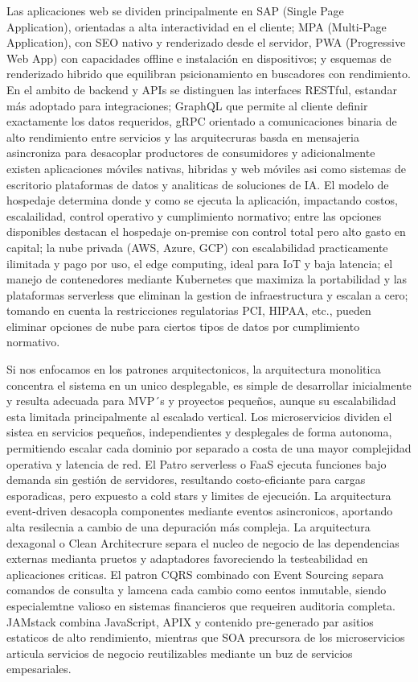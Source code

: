 \documentclass[
	article,			%
	11pt,				%
	oneside,			%
	a4paper,			%
	english,			%
	brazil,				%
	sumario=tradicional
	]{abntex2}
\begin{document}
Las aplicaciones web se dividen principalmente en SAP (Single Page Application), orientadas a alta interactividad en el cliente; MPA (Multi-Page Application), con SEO nativo y renderizado desde el servidor, PWA (Progressive Web App) con capacidades offline e instalación en dispositivos; y esquemas de renderizado hibrido que equilibran psicionamiento en buscadores con rendimiento.  En el ambito de backend y APIs se distinguen las interfaces RESTful, estandar más adoptado para integraciones; GraphQL que permite al cliente definir exactamente los datos requeridos, gRPC orientado a comunicaciones binaria de alto rendimiento entre servicios y las arquitecruras basda en mensajeria asincroniza para desacoplar productores de consumidores y adicionalmente existen aplicaciones móviles nativas, hibridas y web móviles asi como sistemas de escritorio plataformas de datos y analiticas de soluciones de IA.
El modelo de hospedaje determina donde y como se ejecuta la aplicación, impactando costos, escalailidad, control operativo y cumplimiento normativo; entre las opciones disponibles destacan el hospedaje on-premise con control total pero alto gasto en capital; la nube privada (AWS, Azure, GCP) con escalabilidad practicamente ilimitada y pago por uso, el edge computing, ideal para IoT y baja latencia; el manejo de contenedores mediante Kubernetes que maximiza la portabilidad y las plataformas serverless que eliminan la gestion de infraestructura y escalan a cero; tomando en cuenta la restricciones regulatorias PCI, HIPAA, etc., pueden eliminar opciones de nube para ciertos tipos de datos por cumplimiento normativo.

Si nos enfocamos en los patrones arquitectonicos, la arquitectura monolitica concentra el sistema en un unico desplegable, es simple de desarrollar inicialmente y resulta adecuada para MVP´s y proyectos pequeños, aunque su escalabilidad esta limitada principalmente al escalado vertical.  Los microservicios dividen el sistea en servicios pequeños, independientes y desplegales de forma autonoma, permitiendo escalar cada dominio por separado a costa de una mayor complejidad operativa y latencia de red.  El Patro serverless o FaaS ejecuta funciones bajo demanda sin gestión de servidores, resultando costo-eficiante para cargas esporadicas, pero expuesto a cold stars y limites de ejecución.  La arquitectura event-driven desacopla componentes mediante eventos asincronicos, aportando alta resilecnia a cambio de una depuración más compleja.  La arquitectura dexagonal o Clean Architecrure separa el nucleo de negocio de las dependencias externas medianta pruetos y adaptadores favoreciendo la testeabilidad en aplicaciones criticas. El patron CQRS combinado con Event Sourcing separa comandos de consulta y lamcena cada cambio como eentos inmutable, siendo especialemtne valioso en sistemas financieros que requeiren auditoria completa.  JAMstack combina JavaScript, APIX y contenido pre-generado par asitios estaticos de alto rendimiento, mientras que SOA precursora de los microservicios articula servicios de negocio reutilizables mediante un buz de servicios empesariales.
\end{document}
